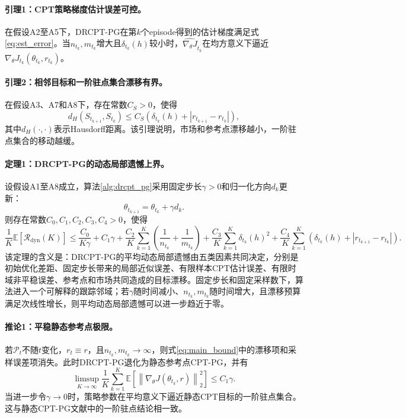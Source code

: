 \paragraph{引理1：CPT策略梯度估计误差可控。}
在假设A2至A5下，DRCPT-PG在第$k$个episode得到的估计梯度满足式\eqref{eq:est_error}。当$n_{t_k},m_{t_k}$增大且$\delta_{t_k}(h)$较小时，$\widehat{\nabla_\theta J}_{t_k}$在均方意义下逼近$\nabla_\theta J_{t_k}(\theta_{t_k},r_{t_k})$。

\paragraph{引理2：相邻目标和一阶驻点集合漂移有界。}
在假设A3、A7和A8下，存在常数$C_S>0$，使得
\begin{equation}
\label{eq:set_drift}
d_H(S_{t_{k+1}},S_{t_k})
\le
C_S
\left(
\delta_{t_k}(h)+|r_{t_{k+1}}-r_{t_k}|
\right),
\end{equation}
其中$d_H(\cdot,\cdot)$表示Hausdorff距离。该引理说明，市场和参考点漂移越小，一阶驻点集合的移动越缓。

\paragraph{定理1：DRCPT-PG的动态局部遗憾上界。}
设假设A1至A8成立，算法\ref{alg:drcpt_pg}采用固定步长$\gamma>0$和归一化方向$d_k$更新：
\begin{equation}
\label{eq:theta_update_theory}
\theta_{t_{k+1}}
=
\theta_{t_k}
+
\gamma d_k.
\end{equation}
则存在常数$C_0,C_1,C_2,C_3,C_4>0$，使得
\begin{equation}
\label{eq:main_bound}
\frac{1}{K}
\mathbb{E}
\left[
\mathcal{R}_{\mathrm{dyn}}(K)
\right]
\le
\frac{C_0}{K\gamma}
+
C_1\gamma
+
\frac{C_2}{K}
\sum_{k=1}^{K}
\left(
\frac{1}{n_{t_k}}
+
\frac{1}{m_{t_k}}
\right)
+
\frac{C_3}{K}
\sum_{k=1}^{K}
\delta_{t_k}(h)^2
+
\frac{C_4}{K}
\sum_{k=1}^{K}
\left(
\delta_{t_k}(h)+|r_{t_{k+1}}-r_{t_k}|
\right).
\end{equation}
该定理的含义是：DRCPT-PG的平均动态局部遗憾由五类因素共同决定，分别是初始优化差距、固定步长带来的局部近似误差、有限样本CPT估计误差、有限时域非平稳误差、参考点和市场共同造成的目标漂移。固定步长和固定采样数下，算法进入一个可解释的跟踪邻域；若$\gamma$随时间减小、$n_{t_k},m_{t_k}$随时间增大，且漂移预算满足次线性增长，则平均动态局部遗憾可以进一步趋近于零。

\paragraph{推论1：平稳静态参考点极限。}
若$\mathcal{P}_t$不随$t$变化，$r_t\equiv r$，且$n_{t_k},m_{t_k}\to\infty$，则式\eqref{eq:main_bound}中的漂移项和采样误差项消失。此时DRCPT-PG退化为静态参考点CPT-PG，并有
\begin{equation}
\label{eq:stationary_corollary}
\limsup_{K\to\infty}
\frac{1}{K}
\sum_{k=1}^{K}
\mathbb{E}
\left[
\left\|
\nabla_\theta J(\theta_{t_k},r)
\right\|_2^2
\right]
\le
C_1\gamma.
\end{equation}
当进一步令$\gamma\to0$时，策略参数在平均意义下逼近静态CPT目标的一阶驻点集合。这与静态CPT-PG文献中的一阶驻点结论相一致\citep{lepel2026policygradients}。

